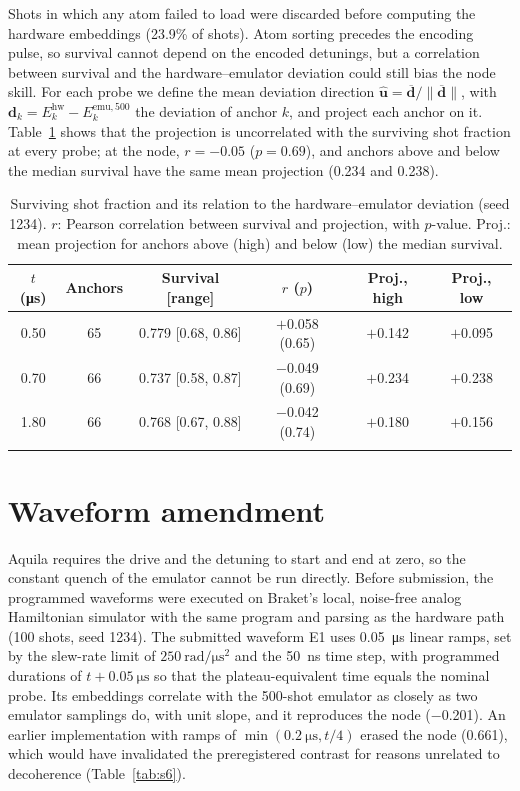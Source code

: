 \documentclass[pdflatex,sn-mathphys-num]{sn-jnl}
\begin{document}
Shots in which any atom failed to load were discarded before computing the hardware embeddings (23.9\% of shots). Atom sorting precedes the encoding pulse, so survival cannot depend on the encoded detunings, but a correlation between survival and the hardware--emulator deviation could still bias the node skill. For each probe we define the mean deviation direction $\hat{\mathbf{u}}=\overline{\mathbf{d}}/\lVert\overline{\mathbf{d}}\rVert$, with $\mathbf{d}_k=E^{\mathrm{hw}}_k-E^{\mathrm{emu,500}}_k$ the deviation of anchor $k$, and project each anchor on it. Table~\ref{tab:s5} shows that the projection is uncorrelated with the surviving shot fraction at every probe; at the node, $r=-0.05$ ($p=0.69$), and anchors above and below the median survival have the same mean projection (0.234 and 0.238).

\begin{table}[htb]
\caption{Surviving shot fraction and its relation to the hardware--emulator deviation (seed 1234). $r$: Pearson correlation between survival and projection, with $p$-value. Proj.: mean projection for anchors above (high) and below (low) the median survival.}\label{tab:s5}
\begin{tabular}{@{}cccccc@{}}
\toprule
$t$ (\si{\micro\second}) & Anchors & Survival [range] & $r$ ($p$) & Proj., high & Proj., low \\
\midrule
0.50 & 65 & 0.779 [0.68, 0.86] & $+$0.058 (0.65) & $+$0.142 & $+$0.095 \\
0.70 & 66 & 0.737 [0.58, 0.87] & $-$0.049 (0.69) & $+$0.234 & $+$0.238 \\
1.80 & 66 & 0.768 [0.67, 0.88] & $-$0.042 (0.74) & $+$0.180 & $+$0.156 \\
\botrule
\end{tabular}
\end{table}

\section{Waveform amendment}\label{sec:s6}

Aquila requires the drive and the detuning to start and end at zero, so the constant quench of the emulator cannot be run directly. Before submission, the programmed waveforms were executed on Braket's local, noise-free analog Hamiltonian simulator with the same program and parsing as the hardware path (100 shots, seed 1234). The submitted waveform E1 uses \SI{0.05}{\micro\second} linear ramps, set by the slew-rate limit of $250~\mathrm{rad}/\si{\micro\second}^2$ and the \SI{50}{ns} time step, with programmed durations of $t+\SI{0.05}{\micro\second}$ so that the plateau-equivalent time equals the nominal probe. Its embeddings correlate with the 500-shot emulator as closely as two emulator samplings do, with unit slope, and it reproduces the node ($-$0.201). An earlier implementation with ramps of $\min(\SI{0.2}{\micro\second},t/4)$ erased the node (0.661), which would have invalidated the preregistered contrast for reasons unrelated to decoherence (Table~\ref{tab:s6}).
\end{document}
